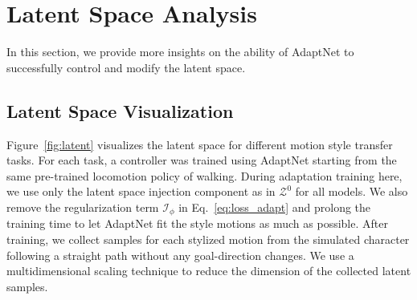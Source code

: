 \section{Latent Space Analysis}
\label{sec:latent}

In this section, we provide more insights on the ability of AdaptNet to successfully control and modify the latent space.  
\subsection{Latent Space Visualization}

Figure~\ref{fig:latent} visualizes the latent space for different motion style transfer tasks. %
For each task, a controller was trained using AdaptNet starting from the same pre-trained locomotion policy of walking. 
During adaptation training here, we use only the latent space injection component 
as in $\mathcal{Z}^0$ for all  models. %
We also remove the regularization term $\mathcal{I}_\phi$ in Eq.~\ref{eq:loss_adapt} and prolong the training time to
let AdaptNet fit the style motions as much as possible. 
After training,
we collect samples for each stylized motion from the simulated character following  a straight path without any goal-direction changes.  
We use a multidimensional scaling technique to reduce the dimension of the collected latent samples. 





